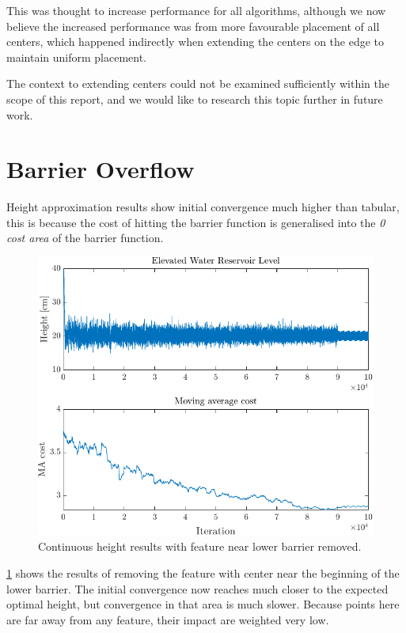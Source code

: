 This was thought to increase performance for all algorithms, although we now believe the increased performance was from more favourable placement of all centers, which happened indirectly when extending the centers on the edge to maintain uniform placement.

The context to extending centers could not be examined sufficiently within the scope of this report, and we would like to research this topic further in future work.

\section{Barrier Overflow}
Height approximation results show initial convergence much higher than tabular, this is because the cost of hitting the barrier function is generalised into the \textit{0 cost area} of the barrier function.

\begin{figure}[h!]
	\centering
	\includegraphics[width=0.7\linewidth]{figures/RemovedCenter.pdf}
	\caption{Continuous height results with feature near lower barrier removed.}
	\label{fig:RemovedCenter}
\end{figure}

\cref{fig:RemovedCenter} shows the results of removing the feature with center near the beginning of the lower barrier. The initial convergence now reaches much closer to the expected optimal height, but convergence in that area is much slower. Because points here are far away from any feature, their impact are weighted very low.

